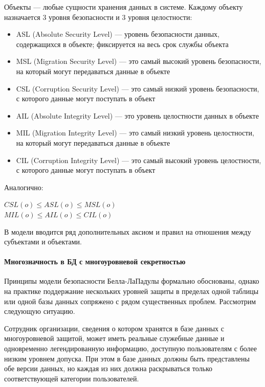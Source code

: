 Объекты --- любые сущности хранения данных в системе. Каждому объекту назначается 3 уровня безопасности и
3 уровня целостности:
\begin{itemize}
    \item ASL (Absolute Security Level) --- уровень безопасности данных, содержащихся в объекте; фиксируется на весь срок
    службы объекта
    \item MSL (Migration Security Level) --- это самый высокий уровень безопасности, на который могут передаваться данные
    в объекте
    \item CSL (Corruption Security Level) --- это самый низкий уровень безопасности, с которого данные могут поступать в объект
    \item AIL (Absolute Integrity Level) --- это уровень целостности данных в объекте
    \item MIL (Migration Integrity Level) --- это самый низкий уровень целостности, на который могут передаваться данные в объекте
    \item CIL (Corruption Integrity Level) --- это самый высокий уровень целостности, с которого данные могут поступать в объект
\end{itemize}

Аналогично:

\begin{center}
$CSL(o) \leqslant ASL(o) \leq MSL(o)$ \\
$MIL(o) \leqslant AIL(o) \leq CIL(o)$
\end{center}

В модели вводится ряд дополнительных аксиом и правил на отношения между субъектами и объектами.

\paragraph{Многозначность в БД с многоуровневой секретностью}

Принципы модели безопасности Белла-ЛаПадулы формально обоснованы, однако на практике поддержание нескольких уровней защиты в пределах одной таблицы или одной базы данных сопряжено с рядом существенных проблем. Рассмотрим следующую ситуацию.

Сотрудник организации, сведения о котором хранятся в базе данных с многоуровневой защитой, может иметь реальные служебные данные и одновременно легендированную информацию, доступную пользователям с более низким уровнем допуска. При этом в базе данных должны быть представлены обе версии данных, но каждая из них должна раскрываться только соответствующей категории пользователей.

